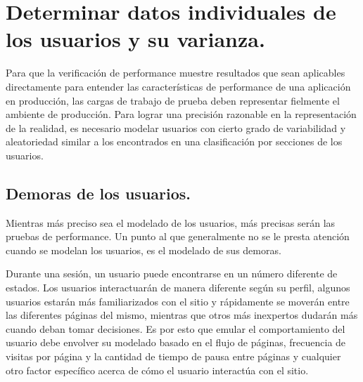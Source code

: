 \section{Determinar datos individuales de los usuarios y su varianza.}
Para que la verificación de performance muestre resultados que sean aplicables directamente para entender las características de performance de una aplicación en producción,
las cargas de trabajo de prueba deben representar fielmente el ambiente de producción. Para lograr una precisión razonable en la representación de la realidad, es necesario modelar
usuarios con cierto grado de variabilidad y aleatoriedad similar a los encontrados en una clasificación por secciones de los usuarios.

\subsection{Demoras de los usuarios.}
Mientras más preciso sea el modelado de los usuarios, más precisas serán las pruebas de performance. Un punto al que generalmente no se le presta atención cuando se modelan los
usuarios, es el modelado de sus demoras.

Durante una sesión, un usuario puede encontrarse en un número diferente de estados. Los usuarios interactuarán de manera diferente según su perfil, algunos usuarios estarán más
familiarizados con el sitio y rápidamente se moverán entre las diferentes páginas del mismo, mientras que otros más inexpertos dudarán más cuando deban tomar decisiones. Es por
esto que emular el comportamiento del usuario debe envolver su modelado basado en el flujo de páginas, frecuencia de visitas por página y la cantidad de tiempo de pausa entre
páginas y cualquier otro factor específico acerca de cómo el usuario interactúa con el sitio.

